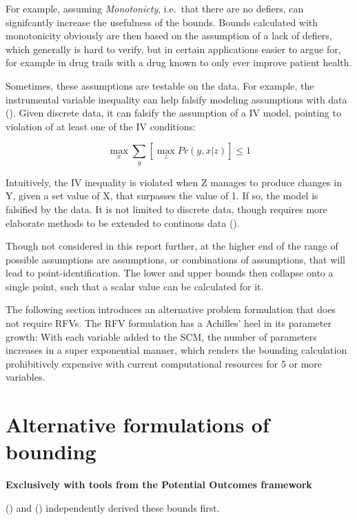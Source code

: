 \documentclass{article}
\begin{document}
For example, assuming \emph{Monotonicty}, i.e.~that there are no
defiers, can signifcantly increase the usefulness of the bounds. Bounds
calculated with monotonicity obviously are then based on the assumption
of a lack of defiers, which generally is hard to verify, but in certain
applications easier to argue for, for example in drug trails with a drug
known to only ever improve patient health.

Sometimes, these assumptions are testable on the data. For example, the
instrumental variable inequality can help falsify modeling assumptions
with data (\cite{pearl2013testability}). Given discrete data, it can falsify the
assumption of a IV model, pointing to violation of at least one of the
IV conditions:

\[ \max_x \sum_y [\max_z Pr(y,x|z)] \leq 1 \]

Intuitively, the IV inequality is violated when Z manages to produce
changes in Y, given a set value of X, that surpasses the value of 1. If
so, the model is falsified by the data. It is not limited to discrete
data, though requires more elaborate methods to be extended to continous
data (\cite{kedagni2020generalized}).

Though not considered in this report further, at the higher end of
the range of possible assumptions are assumptions, or combinations of
assumptions, that will lead to point-identification. The lower and
upper bounds then collapse onto a single point, such that a scalar value can be calculated for it.

The following section introduces an alternative problem formulation that does not require RFVs. The RFV formulation has a Achilles' heel in its parameter growth: With each variable added to the SCM, the number of parameters increases in a super exponential manner, which renders the bounding calculation prohibitively expensive with current computational resources for 5 or more variables.

\appendix

\section{Alternative formulations of bounding}

\textbf{Exclusively with tools from the Potential Outcomes
framework}
\label{appendix:alternative_formulations}

(\cite{robins1989analysis}) and (\cite{manski1990nonparametric}) independently derived these bounds first.
\end{document}

